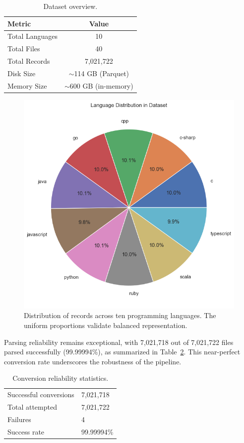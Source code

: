 \documentclass{article}
\begin{document}
\begin{table}[H]
\centering
\caption{Dataset overview.}
\label{tab:dataset-overview}
\begin{tabular}{lc}
\toprule
\textbf{Metric} & \textbf{Value} \\
\midrule
Total Languages & 10 \\
Total Files & 40 \\
Total Records & 7,021,722 \\
Disk Size & $\sim$114 GB (Parquet) \\
Memory Size & $\sim$600 GB (in-memory) \\
\bottomrule
\end{tabular}
\end{table}

\begin{figure}[H]
\centering
\includegraphics[width=0.55\linewidth]{pie_chart_language_distribution.png}
\caption{Distribution of records across ten programming languages. The uniform proportions validate balanced representation.}
\label{fig:pie-language}
\end{figure}

Parsing reliability remains exceptional, with 7,021,718 out of 7,021,722 files parsed successfully (99.99994\%), as summarized in Table~\ref{tab:conversion-stats}. This near-perfect conversion rate underscores the robustness of the pipeline.

\begin{table}[H]
\centering
\caption{Conversion reliability statistics.}
\label{tab:conversion-stats}
\begin{tabular}{l l}
\toprule
Successful conversions & 7,021,718 \\
Total attempted & 7,021,722 \\
Failures & 4 \\
Success rate & 99.99994\% \\
\bottomrule
\end{tabular}
\end{table}
\end{document}
